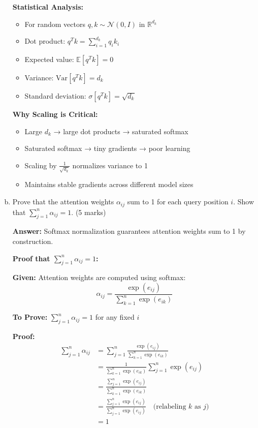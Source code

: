 \documentclass[12pt]{article}
\newcommand{\answer}[1]{{\color{answercolor}\textbf{Answer:} #1}}
\newcommand{\explanation}[1]{{\color{explanationcolor}#1}}
\begin{document}
\begin{center}
\begin{enumerate}[(a)]
{    \textbf{Statistical Analysis:}
    \begin{itemize}
        \item For random vectors $q, k \sim \mathcal{N}(0, I)$ in $\mathbb{R}^{d_k}$
        \item Dot product: $q^T k = \sum_{i=1}^{d_k} q_i k_i$
        \item Expected value: $\mathbb{E}[q^T k] = 0$
        \item Variance: $\text{Var}[q^T k] = d_k$
        \item Standard deviation: $\sigma[q^T k] = \sqrt{d_k}$
    \end{itemize}
    
    \textbf{Why Scaling is Critical:}
    \begin{itemize}
        \item Large $d_k$ → large dot products → saturated softmax
        \item Saturated softmax → tiny gradients → poor learning
        \item Scaling by $\frac{1}{\sqrt{d_k}}$ normalizes variance to 1
        \item Maintains stable gradients across different model sizes
    \end{itemize}
    }
    
    \item Prove that the attention weights $\alpha_{ij}$ sum to 1 for each query position $i$. Show that $\sum_{j=1}^n \alpha_{ij} = 1$. \hfill (5 marks)
    
    \answer{Softmax normalization guarantees attention weights sum to 1 by construction.}
    
    \explanation{
    \textbf{Proof that $\sum_{j=1}^n \alpha_{ij} = 1$:}
    
    \textbf{Given:} Attention weights are computed using softmax:
    $$\alpha_{ij} = \frac{\exp(e_{ij})}{\sum_{k=1}^n \exp(e_{ik})}$$
    
    \textbf{To Prove:} $\sum_{j=1}^n \alpha_{ij} = 1$ for any fixed $i$
    
    \textbf{Proof:}
    \begin{align}
        \sum_{j=1}^n \alpha_{ij} &= \sum_{j=1}^n \frac{\exp(e_{ij})}{\sum_{k=1}^n \exp(e_{ik})} \\
        &= \frac{1}{\sum_{k=1}^n \exp(e_{ik})} \sum_{j=1}^n \exp(e_{ij}) \\
        &= \frac{\sum_{j=1}^n \exp(e_{ij})}{\sum_{k=1}^n \exp(e_{ik})} \\
        &= \frac{\sum_{j=1}^n \exp(e_{ij})}{\sum_{j=1}^n \exp(e_{ij})} \quad \text{(relabeling } k \text{ as } j\text{)} \\
        &= 1
    \end{align}
    
}
\end{enumerate}
\end{center}
\end{document}

